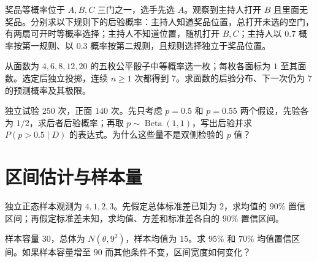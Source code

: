 \begin{exercise}[主持人规则改变三门问题]\label{q:M-P7-1}
奖品等概率位于 $A,B,C$ 三门之一，选手先选 $A$。观察到主持人打开 $B$ 且里面无奖品。分别求以下规则下的后验概率：主持人知道奖品位置，总打开未选的空门，有两扇可开时等概率选择；主持人不知道位置，随机打开 $B,C$；主持人以 $0.7$ 概率按第一规则、以 $0.3$ 概率按第二规则，且规则选择独立于奖品位置。\par{}\end{exercise}

\begin{exercise}[未知面数骰子的预测]\label{q:M-P7-2}
从面数为 $4,6,8,12,20$ 的五枚公平骰子中等概率选一枚；每枚各面标为 $1$ 至其面数。选定后独立投掷，连续 $n\ge1$ 次都得到 $7$。求面数的后验分布、下一次仍为 $7$ 的预测概率及其极限。\par{}\end{exercise}

\begin{exercise}[显著性与后验概率的区别]\label{q:M-P8-1fg}
独立试验 $250$ 次，正面 $140$ 次。先只考虑 $p=0.5$ 和 $p=0.55$ 两个假设，先验各为 $1/2$，求后者后验概率；再取 $p\sim\operatorname{Beta}(1,1)$，写出后验并求 $P(p>0.5\mid D)$ 的表达式。为什么这些量不是双侧检验的 $p$ 值？\par{}\end{exercise}

\clearpage\section{区间估计与样本量}

\begin{exercise}[小样本正态总体的三类区间]\label{q:M-C22-1}
独立正态样本观测为 $4,1,2,3$。先假定总体标准差已知为 $2$，求均值的 $90\%$ 置信区间；再假定标准差未知，求均值、方差和标准差各自的 $90\%$ 置信区间。\par{}\end{exercise}

\begin{exercise}[已知标准差的置信水平比较]\label{q:M-P10-1}
样本容量 $30$，总体为 $N(\theta,9^2)$，样本均值为 $15$。求 $95\%$ 和 $70\%$ 均值置信区间。如果样本容量增至 $90$ 而其他条件不变，区间宽度如何变化？\par{}\end{exercise}

